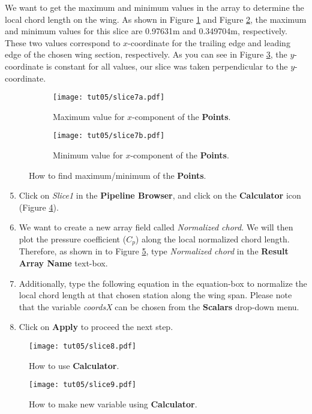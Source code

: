 We want to get the maximum and minimum values in the array to determine the local chord length on the wing. As shown in Figure \ref{fig5:slice7 a} and Figure \ref{fig5:slice7 b}, the maximum and minimum values for this slice are 0.97631m and 0.349704m, respectively. These two values correspond to $x$-coordinate for the trailing edge and leading edge of the chosen wing section, respectively. As you can see in Figure \ref{fig5:slice7}, the $y$-coordinate is constant for all values, our slice was taken perpendicular to the $y$-coordinate.
\begin{figure}[ht]
    \centering
     \begin{subfigure}[b]{.75\textwidth}
         \centering
         \texttt{[image: tut05/slice7a.pdf]}
         \caption{Maximum value for $x$-component of the \textbf{Points}.}
         \label{fig5:slice7 a}
     \end{subfigure}
     \hfill
     \begin{subfigure}[b]{.75\textwidth}
         \centering
         \texttt{[image: tut05/slice7b.pdf]}
         \caption{Minimum value for $x$-component of the \textbf{Points}.}
         \label{fig5:slice7 b}
     \end{subfigure}     
    \caption{How to find maximum/minimum of the \textbf{Points}.}
    \label{fig5:slice7}
\end{figure}
\begin{enumerate}[label=\arabic*)]
	\setcounter{enumi}{4}
	\item Click on \textit{Slice1} in the \textbf{Pipeline Browser}, and click on the \textbf{Calculator} icon (Figure \ref{fig5:slice8}).
	\item We want to create a new array field called \textit{Normalized chord}. We will then plot the pressure coefficient ($C_p$) along the local normalized chord length. Therefore, as shown in to Figure \ref{fig5:slice9}, type \textit{Normalized chord} in the \textbf{Result Array Name} text-box.
	\item  Additionally, type the following equation in the equation-box to normalize the local chord length at that chosen station along the wing span. Please note that the variable \textit{coordsX} can be chosen from the \textbf{Scalars} drop-down menu.
	\item Click on \textbf{Apply} to proceed the next step.
\end{enumerate}
\begin{figure}[ht]
    \centering
    \texttt{[image: tut05/slice8.pdf]}
    \caption{How to use \textbf{Calculator}.}
    \label{fig5:slice8}
\end{figure}
\begin{figure}[H]
    \centering
    \texttt{[image: tut05/slice9.pdf]}
    \caption{How to make new variable using \textbf{Calculator}.}
    \label{fig5:slice9}
\end{figure}

